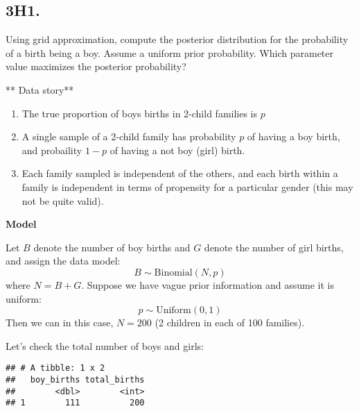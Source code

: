 \documentclass[
]{book}
\newenvironment{Shaded}{\begin{snugshade}}{\end{snugshade}}
\newcommand{\DataTypeTok}[1]{\textcolor[rgb]{0.13,0.29,0.53}{#1}}
\newcommand{\KeywordTok}[1]{\textcolor[rgb]{0.13,0.29,0.53}{\textbf{#1}}}
\newcommand{\NormalTok}[1]{#1}
\newcommand{\OperatorTok}[1]{\textcolor[rgb]{0.81,0.36,0.00}{\textbf{#1}}}
\newcommand{\StringTok}[1]{\textcolor[rgb]{0.31,0.60,0.02}{#1}}
\providecommand{\tightlist}{%
  \setlength{\itemsep}{0pt}\setlength{\parskip}{0pt}}
\begin{document}
\hypertarget{h1.}{%
\subsection{3H1.}\label{h1.}}

Using grid approximation, compute the posterior distribution for the probability of a birth being a boy. Assume a uniform prior probability. Which parameter value maximizes the posterior probability?

** Data story**

\begin{enumerate}
\def\labelenumi{\arabic{enumi}.}
\tightlist
\item
  The true proportion of boys births in 2-child families is \(p\)
\item
  A single sample of a 2-child family has probability \(p\) of having a boy birth, and probaility \(1-p\) of having a not boy (girl) birth.
\item
  Each family sampled is independent of the others, and each birth within a family is independent in terms of propensity for a particular gender (this may not be quite valid).
\end{enumerate}

\textbf{Model}

Let \(B\) denote the number of boy births and \(G\) denote the number of girl births, and assign the data model:
\[
 B \sim \text{Binomial}(N,p)
\]
where \(N = B + G\). Suppose we have vague prior information and assume it is uniform:
\[
p \sim \text{Uniform}(0,1)
\]
Then we can in this case, \(N=200\) (2 children in each of 100 families).

Let's check the total number of boys and girls:

\begin{Shaded}
\end{Shaded}

\begin{verbatim}
## # A tibble: 1 x 2
##   boy_births total_births
##        <dbl>        <int>
## 1        111          200
\end{verbatim}
\end{document}
